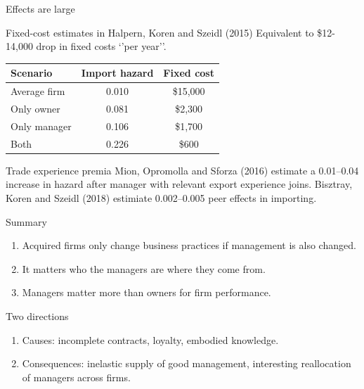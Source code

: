 \documentclass[
  ignorenonframetext,
  aspectratio=43,
]{beamer}
\providecommand{\tightlist}{%
  \setlength{\itemsep}{0pt}\setlength{\parskip}{0pt}}
\begin{document}
\begin{frame}{Effects are large}
\protect\hypertarget{effects-are-large}{}
\begin{block}{Fixed-cost estimates in Halpern, Koren and Szeidl (2015)}
\protect\hypertarget{fixed-cost-estimates-in-halpern-koren-and-szeidl-2015}{}
Equivalent to \$12-14,000 drop in fixed costs `'per year''.

\begin{tabular}{l|cc}
Scenario & Import hazard & Fixed cost \\
\hline
Average firm & 0.010 & \$15,000\\
Only owner & 0.081 & \$2,300\\
Only manager & 0.106 & \$1,700\\
Both & 0.226 & \$600
\end{tabular}
\end{block}

\begin{block}{Trade experience premia}
\protect\hypertarget{trade-experience-premia}{}
Mion, Opromolla and Sforza (2016) estimate a 0.01--0.04 increase in
hazard after manager with relevant export experience joins. Bisztray,
Koren and Szeidl (2018) estimiate 0.002--0.005 peer effects in
importing.
\end{block}
\end{frame}

\begin{frame}{Summary}
\protect\hypertarget{summary}{}
\begin{enumerate}
\tightlist
\item
  Acquired firms only change business practices if management is also
  changed.
\item
  It matters who the managers are where they come from.
\item
  Managers matter more than owners for firm performance.
\end{enumerate}
\end{frame}

\begin{frame}{Two directions}
\protect\hypertarget{two-directions}{}
\begin{enumerate}
\tightlist
\item
  Causes: incomplete contracts, loyalty, embodied knowledge.
\item
  Consequences: inelastic supply of good management, interesting
  reallocation of managers across firms.
\end{enumerate}
\end{frame}
\end{document}
